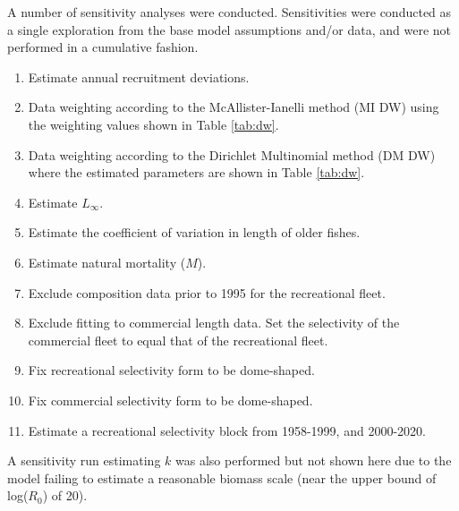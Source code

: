 \documentclass[11pt,
  english,
  a4paper,
]{article}
\begin{document}
A number of sensitivity analyses were conducted. Sensitivities were conducted as a single exploration from the base model assumptions and/or data, and were not performed in a cumulative fashion.

\leavevmode\tagmcend\tagstructend\par

\begin{enumerate}
   
  \item Estimate annual recruitment deviations. 

  \item Data weighting according to the McAllister-Ianelli method (MI DW) using the weighting values shown in Table \ref{tab:dw}. 
  
  \item Data weighting according to the Dirichlet Multinomial method (DM DW) where the estimated parameters are shown in Table \ref{tab:dw}. 

  \item Estimate $L_{\infty}$.

  \item Estimate the coefficient of variation in length of older fishes.

  \item Estimate natural mortality ($M$).
  
  \item Exclude composition data prior to 1995 for the recreational fleet.
  
  \item Exclude fitting to commercial length data. Set the selectivity of the commercial fleet to equal that of the recreational fleet.
  
  \item Fix recreational selectivity form to be dome-shaped. 
  
  \item Fix commercial selectivity form to be dome-shaped.

  \item Estimate a recreational selectivity block from 1958-1999, and 2000-2020.   
  
\end{enumerate}


A sensitivity run estimating {\(k\)\leavevmode\tagmcend\tagstructend} was also performed but not shown here due to the model failing to estimate a reasonable biomass scale (near the upper bound of log({\(R_0\)\leavevmode\tagmcend\tagstructend}) of 20).
\end{document}
